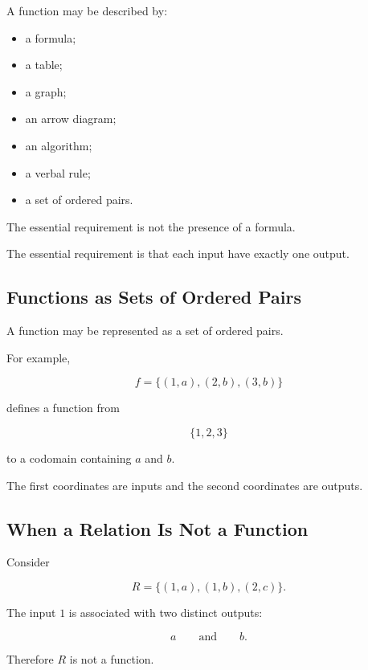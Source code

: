 A function may be described by:

\begin{itemize}
    \item a formula;
    \item a table;
    \item a graph;
    \item an arrow diagram;
    \item an algorithm;
    \item a verbal rule;
    \item a set of ordered pairs.
\end{itemize}

The essential requirement is not the presence of a formula.

The essential requirement is that each input have exactly one output.

\subsection{Functions as Sets of Ordered Pairs}
\label{subsec:function-ordered-pairs}

A function may be represented as a set of ordered pairs.

For example,

\[ f=\{(1,a),(2,b),(3,b)\} \]

defines a function from

\[ \{1,2,3\} \]

to a codomain containing \(a\) and \(b\).

The first coordinates are inputs and the second coordinates are outputs.

\subsection{When a Relation Is Not a Function}
\label{subsec:not-a-function}

Consider

\[ R=\{(1,a),(1,b),(2,c)\}. \]

The input \(1\) is associated with two distinct outputs:

\[ a\qquad\text{and}\qquad b. \]

Therefore \(R\) is not a function.

